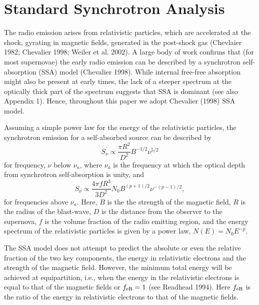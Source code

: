 \documentclass{emulateapj}
\begin{document}
\section{Standard Synchrotron Analysis}
\label{sec:SSA}

The radio emission arises from relativistic
particles, which are accelerated at the shock, gyrating in magnetic
fields, generated in the
post-shock gas (Chevlaier 1982; Chevalier 1998; Weiler et al. 2002). A
large body of work confirms that (for most supernovae) the early radio
emission can be described by a synchrotron self-absorption (SSA) model
(Chevalier 1998). While internal free-free absorption might also be present at
early times, the lack of a steeper spectrum at the optically thick
part of the spectrum suggests that SSA is dominant (see also Appendix 1). Hence, throughout
this paper we adopt Chevalier (1998) SSA model.


Assuming a simple power law for the energy of the relativistic
particles, the synchrotron emission for a self-absorbed source can be described by
\begin{equation}
S_{\nu}\propto \frac{\pi
  R^{2}}{D^{2}}B^{-1/2}\nu^{5/2}
\label{eq:SSA1}
\end{equation}
for frequency, $\nu$ below $\nu_a$, where $\nu_a$ is the
frequency at which the optical depth from synchrotron self-absorption is unity, and 
\begin{equation}
S_{\nu}\propto \frac{4 \pi
  f R^{3}}{3 D^{2}}N_{0}B^{(p + 1)/2}\nu^{-(p - 1)/2},
\label{eq:SSA2}
\end{equation} 
for frequencies above $\nu_{a}$.
Here, $B$ is the the strength of the magnetic field, $R$ is
the radius of the blast-wave, $D$ is the distance from the observer to
the supernova, $f$ is the volume fraction of the radio emitting
region, and the energy spectrum of the relativistic particles
is given by a power law, 
$N(E)=N_{0}E^{-p}$. 

The SSA model does not attempt to predict the absolute or even
the relative 
fraction of the two key components, the energy in relativistic electrons
and the strength of the magnetic field.  
However, the minimum total energy will be
achieved at equipartition, i.e., when the energy in the relativistic electrons is equal to that of the
magnetic fields or $f_{\rm eB}=1$ (see Readhead 1994). Here $f_{\rm eB}$ is the ratio
of the energy in relativistic electrons to that of the magnetic fields.
\end{document}
